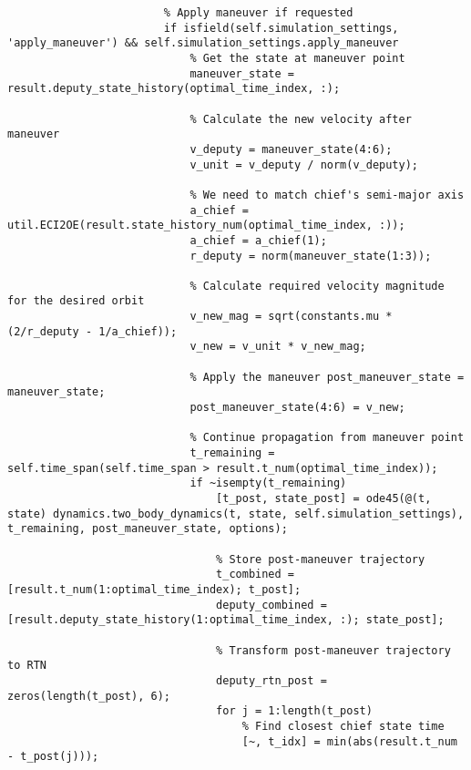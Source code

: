 \begin{lstlisting}
                        % Apply maneuver if requested
                        if isfield(self.simulation_settings, 'apply_maneuver') && self.simulation_settings.apply_maneuver
                            % Get the state at maneuver point
                            maneuver_state = result.deputy_state_history(optimal_time_index, :);
                            
                            % Calculate the new velocity after maneuver
                            v_deputy = maneuver_state(4:6);
                            v_unit = v_deputy / norm(v_deputy);
                            
                            % We need to match chief's semi-major axis
                            a_chief = util.ECI2OE(result.state_history_num(optimal_time_index, :));
                            a_chief = a_chief(1);
                            r_deputy = norm(maneuver_state(1:3));
                            
                            % Calculate required velocity magnitude for the desired orbit
                            v_new_mag = sqrt(constants.mu * (2/r_deputy - 1/a_chief));
                            v_new = v_unit * v_new_mag;
                            
                            % Apply the maneuver post_maneuver_state = maneuver_state;
                            post_maneuver_state(4:6) = v_new;
                            
                            % Continue propagation from maneuver point
                            t_remaining = self.time_span(self.time_span > result.t_num(optimal_time_index));
                            if ~isempty(t_remaining)
                                [t_post, state_post] = ode45(@(t, state) dynamics.two_body_dynamics(t, state, self.simulation_settings), t_remaining, post_maneuver_state, options);
                                
                                % Store post-maneuver trajectory
                                t_combined = [result.t_num(1:optimal_time_index); t_post];
                                deputy_combined = [result.deputy_state_history(1:optimal_time_index, :); state_post];
                                
                                % Transform post-maneuver trajectory to RTN
                                deputy_rtn_post = zeros(length(t_post), 6);
                                for j = 1:length(t_post)
                                    % Find closest chief state time
                                    [~, t_idx] = min(abs(result.t_num - t_post(j)));
                                    

\end{lstlisting}
